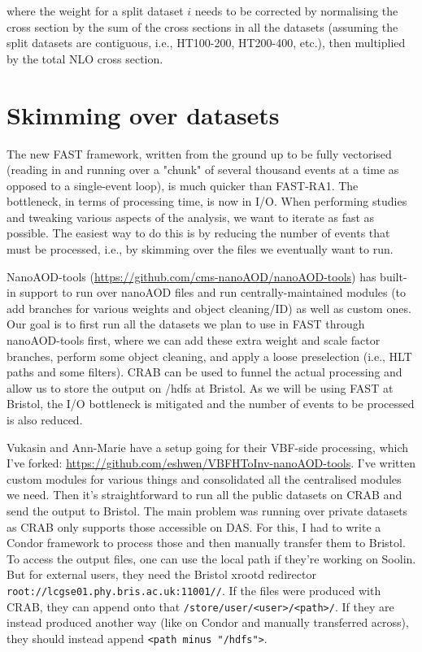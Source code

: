 where the weight for a split dataset $i$ needs to be corrected by normalising the cross section by the sum of the cross sections in all the datasets (assuming the split datasets are contiguous, i.e., HT100-200, HT200-400, etc.), then multiplied by the total NLO cross section.


\section{Skimming over datasets}
The new FAST framework, written from the ground up to be fully vectorised (reading in and running over a "chunk" of several thousand events at a time as opposed to a single-event loop), is much quicker than FAST-RA1. The bottleneck, in terms of processing time, is now in I/O. When performing studies and tweaking various aspects of the analysis, we want to iterate as fast as possible. The easiest way to do this is by reducing the number of events that must be processed, i.e., by skimming over the files we eventually want to run.

NanoAOD-tools (\url{https://github.com/cms-nanoAOD/nanoAOD-tools}) has built-in support to run over nanoAOD files and run centrally-maintained modules (to add branches for various weights and object cleaning/ID) as well as custom ones. Our goal is to first run all the datasets we plan to use in FAST through nanoAOD-tools first, where we can add these extra weight and scale factor branches, perform some object cleaning, and apply a loose preselection (i.e., HLT paths and some filters). CRAB can be used to funnel the actual processing and allow us to store the output on /hdfs at Bristol. As we will be using FAST at Bristol, the I/O bottleneck is mitigated and the number of events to be processed is also reduced.

Vukasin and Ann-Marie have a setup going for their VBF-side processing, which I've forked: \url{https://github.com/eshwen/VBFHToInv-nanoAOD-tools}. I've written custom modules for various things and consolidated all the centralised modules we need. Then it's straightforward to run all the public datasets on CRAB and send the output to Bristol. The main problem was running over private datasets as CRAB only supports those accessible on DAS. For this, I had to write a Condor framework to process those and then manually transfer them to Bristol. To access the output files, one can use the local path if they're working on Soolin. But for external users, they need the Bristol xrootd redirector \texttt{root://lcgse01.phy.bris.ac.uk:11001//}. If the files were produced with CRAB, they can append onto that \texttt{/store/user/<user>/<path>/}. If they are instead produced another way (like on Condor and manually transferred across), they should instead append \texttt{<path minus "/hdfs">}.


